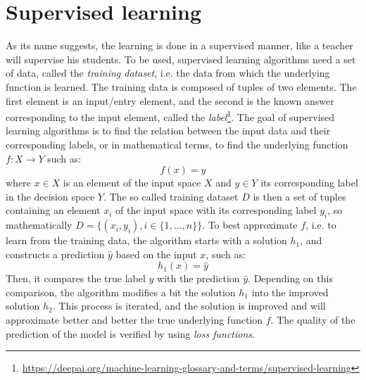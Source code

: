 \section{Supervised learning}
\label{sec:sl}
As its name suggests, the learning is done in a supervised manner, like a teacher will supervise his students. To be used, supervised learning algorithms need a set of data, called the \emph{training dataset}, i.e. the data from which the underlying function is learned. The training data is composed of tuples of two elements. The first element is an input/entry element, and the second is the known answer corresponding to the input element, called the \emph{label}\footnote{\url{https://deepai.org/machine-learning-glossary-and-terms/supervised-learning}}. The goal of supervised learning algorithms is to find the relation between the input data and their corresponding labels, or in mathematical terms, to find the underlying function $f: X \to Y$ such as:
\begin{equation}
  f(x) = y
\end{equation}
where $x \in X$ is an element of the input space $X$ and $y \in Y$ its corresponding label in the decision space $Y$. The so called training dataset $D$ is then a set of tuples containing an element $x_i$ of the input space with its corresponding label $y_i$, so mathematically $D = \{(x_i, y_i), i \in \{1, ..., n\}\}$. To best approximate $f$, i.e. to learn from the training data, the algorithm starts with a solution $h_1$, and constructs a prediction $\hat{y}$ based on the input $x$, such as:
\begin{equation}
  h_1(x) = \hat{y}
\end{equation}
Then, it compares the true label $y$ with the prediction $\hat{y}$. Depending on this comparison, the algorithm modifies a bit the solution $h_1$ into the improved solution $h_2$. This process is iterated, and the solution is improved and will approximate better and better the true underlying function $f$. The quality of the prediction of the model is verified by using \emph{loss functions}.

